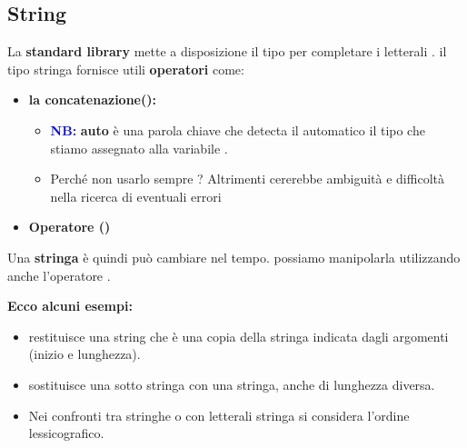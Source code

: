 \subsection{String}
La \textbf{standard library} mette a disposizione il tipo  per completare i letterali . \newline il tipo stringa fornisce utili \textbf{operatori} come:

\begin{itemize}
    \item \textbf{la concatenazione(\code{+}):}
    \begin{tcolorbox}[width=15cm, boxsep=10pt]
        
        \begin{itemize}
            \item  \textbf{\textcolor{blue}{NB:}} \textbf{auto} è una parola chiave che detecta il automatico il tipo che stiamo assegnato alla variabile .
            \item Perché non usarlo sempre ? Altrimenti cererebbe ambiguità e difficoltà nella ricerca di eventuali errori
        \end{itemize}
    \end{tcolorbox}
    \item \textbf{Operatore (\code{+=})}
    
\end{itemize}
Una \textbf{stringa} è  quindi può cambiare nel  tempo. \newline possiamo manipolarla utilizzando anche l'operatore \textbf{\textcolor{blue}{\code{[]}}}. \newline
\begin{tcolorbox}[width=15cm, boxsep=10pt]
    \textbf{Ecco alcuni esempi:}
    
\end{tcolorbox}

\begin{itemize}
    \item \textcolor{blue}{} restituisce una string che è una copia della
    stringa indicata dagli argomenti (inizio e lunghezza).
    \item \textcolor{blue}{} sostituisce una sotto stringa con una stringa,
    anche di lunghezza diversa.
    \item Nei confronti tra stringhe o con letterali stringa si considera
    l’ordine lessicografico.
\end{itemize}
